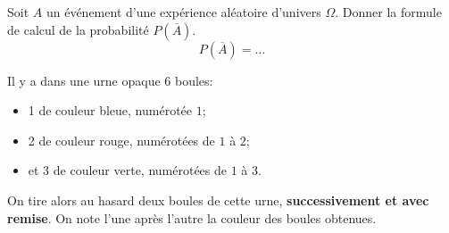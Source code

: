\documentclass{controle}
\begin{document}
\newpage

\setcounter{page}{1}
\titleandname{}

\version
\begin{questions}
\question[2] \hfill 

\vspace*{0.1cm}
Soit $A$ un événement d'une expérience aléatoire d'univers $\Omega$. Donner la formule de calcul de la probabilité $P(\overbar{A})$.
\begin{equation*}
P(\overbar{A}) = \dots
\end{equation*}

\vspace*{0.25cm}
\question[8] \hfill

\vspace*{0.1cm}
Il y a dans une urne opaque \num{6} boules:
\begin{itemize}
\item \num{1} de couleur bleue, numérotée $1$;
\item \num{2} de couleur rouge, numérotées de $1$ à $2$;
\item et \num{3} de couleur verte, numérotées de $1$ à $3$. 
\end{itemize}
On tire alors au hasard deux boules de cette urne, \textbf{successivement et avec remise}. On note l'une après l'autre la couleur des boules obtenues.
\end{questions}
\end{document}
